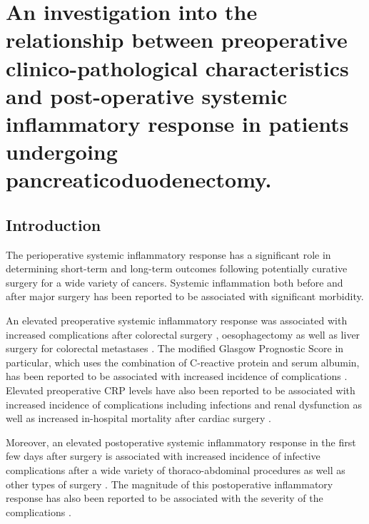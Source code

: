 
\chapter{An investigation into the relationship between preoperative clinico-pathological characteristics and post-operative systemic inflammatory response in patients undergoing pancreaticoduodenectomy.}
\label{ch_pre_post_sirs}

\clearpage


\section{Introduction}
The perioperative systemic inflammatory response has a significant role in determining short-term and long-term outcomes following potentially curative surgery for a wide variety of cancers. 
Systemic inflammation both before and after major surgery has been reported to be associated with significant morbidity. 

An elevated preoperative systemic inflammatory response was associated with increased complications after colorectal surgery \parencite{moyes_preoperative_2009, kubo_elevated_2013}, oesophagectomy \parencite{vashist_glasgow_2010} as well as liver surgery for colorectal metastases \parencite{neal_preoperative_2011}. 
The modified Glasgow Prognostic Score in particular, which uses the combination of C-reactive protein and serum albumin, has been reported to be associated with increased incidence of complications \parencite{moyes_preoperative_2009, mohri_correlation_2014, vashist_glasgow_2010}.
Elevated preoperative CRP levels have also been reported to be associated with increased incidence of complications including infections and renal dysfunction as well as increased in-hospital mortality after cardiac surgery \parencite{lorenzo_increased_2012, mezzomo_preoperative_2011, kim_predictive_2009, biancari_preoperative_2003, boeken_increased_1998}.

Moreover, an elevated postoperative systemic inflammatory response in the first few days after surgery is associated with increased incidence of infective complications after a wide variety of thoraco-abdominal procedures \parencite{singh_systematic_2014, platt_c-reactive_2012, dutta_persistent_2011, welsch_persisting_2008} as well as other types of surgery \parencite{mcneer_early_2010, laporta_baez_c-reactive_2011}.
The magnitude of this postoperative inflammatory response has also been reported to be associated with the severity of the complications \parencite{mcsorley_postoperative_2015}. 

